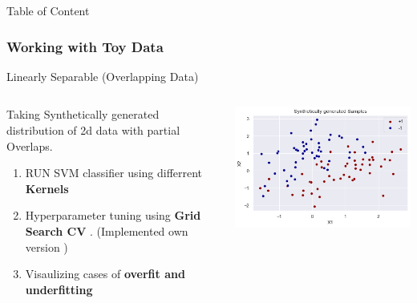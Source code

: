 \documentclass[12pt,t]{beamer}
\begin{document}
\begin{frame}[t]{Table of Content}
    \scriptsize
    \tableofcontents
\end{frame}


\subsubsection{ Working with Toy Data}
\begin{frame}[t]{Linearly Separable (Overlapping Data)}
    \scriptsize
    \begin{columns}[t]
        \begin{column}[T]{0.50\linewidth}
            Taking Synthetically generated distribution of 2d data with partial Overlaps.
            \\
            \begin{enumerate}
                \item RUN SVM classifier using differrent \textbf{Kernels} 
                \item Hyperparameter tuning using \textbf{ Grid Search CV} . (Implemented own version )
                \item Visaulizing cases of \textbf{overfit and underfitting}
            \end{enumerate}
        \end{column}
        \begin{column}[T]{0.50\linewidth}
            \includegraphics[width=\linewidth]{images/p1a/1/1.png}
        \end{column}
    \end{columns}

    \begin{columns}[]


\end{columns}
\end{frame}
\end{document}
